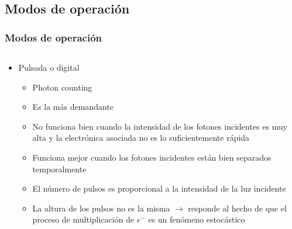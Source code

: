 \documentclass{beamer}
\begin{document}
\subsection{Modos de operación}

\begin{frame}
\frametitle{Modos de operación}
\begin{columns}
\begin{column}{0.60\textwidth}
\begin{block}{}
\begin{itemize}
\item Pulsada o digital
\begin{itemize}
\item Photon counting
\item Es la más demandante
\item No funciona bien cuando la intensidad de los fotones incidentes es muy alta y la
electrónica asociada no es lo suficientemente rápida
\item Funciona mejor cuando los fotones incidentes están bien separados temporalmente
\item El número de pulsos es proporcional a la intensidad de la luz incidente  
\item {\color{blue}La altura de los pulsos no es la misma $\rightarrow$ responde al hecho de
que el proceso de multiplicación de $e^-$ es un fenómeno estocástico}
\end{itemize}


\end{itemize}
\end{block}
\end{column}
\end{columns}
\end{frame}
\end{document}
